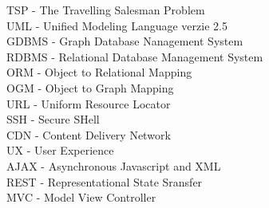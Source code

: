 TSP - The Travelling Salesman Problem\\
UML - Unified Modeling Language verzie 2.5\\
GDBMS - Graph Database Nanagement System\\
RDBMS - Relational Database Management System\\
ORM - Object to Relational Mapping\\
OGM - Object to Graph Mapping\\
URL - Uniform Resource Locator\\
SSH - Secure SHell\\
CDN - Content Delivery Network\\
UX - User Experience\\
AJAX - Asynchronous Javascript and XML\\ 
REST - Representational State Sransfer\\
MVC - Model View Controller\\